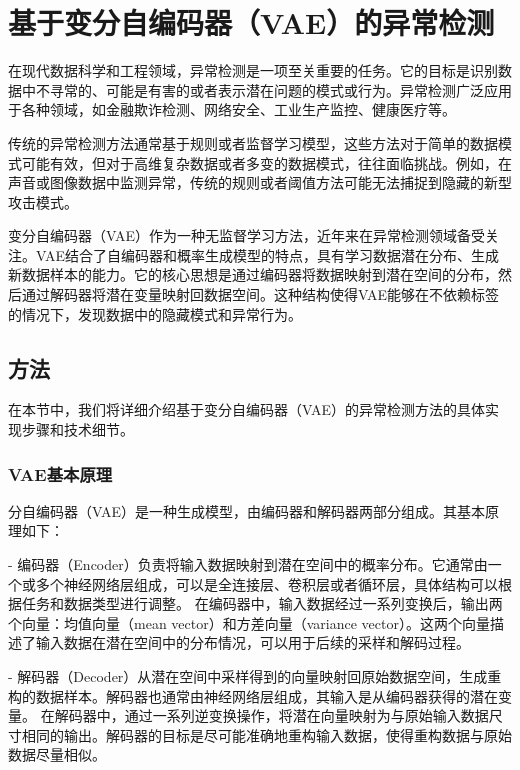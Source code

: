 
\section{基于变分自编码器（VAE）的异常检测}

在现代数据科学和工程领域，异常检测是一项至关重要的任务。它的目标是识别数据中不寻常的、可能是有害的或者表示潜在问题的模式或行为。异常检测广泛应用于各种领域，如金融欺诈检测、网络安全、工业生产监控、健康医疗等。

传统的异常检测方法通常基于规则或者监督学习模型，这些方法对于简单的数据模式可能有效，但对于高维复杂数据或者多变的数据模式，往往面临挑战。例如，在声音或图像数据中监测异常，传统的规则或者阈值方法可能无法捕捉到隐藏的新型攻击模式。

变分自编码器（VAE）\cite{VAE}作为一种无监督学习方法，近年来在异常检测领域备受关注。VAE结合了自编码器和概率生成模型的特点，具有学习数据潜在分布、生成新数据样本的能力。它的核心思想是通过编码器将数据映射到潜在空间的分布，然后通过解码器将潜在变量映射回数据空间。这种结构使得VAE能够在不依赖标签的情况下，发现数据中的隐藏模式和异常行为\cite{VAEAD}。

\subsection{方法}

在本节中，我们将详细介绍基于变分自编码器（VAE）的异常检测方法的具体实现步骤和技术细节。


\subsubsection{VAE基本原理}

分自编码器（VAE）是一种生成模型，由编码器和解码器两部分组成。其基本原理如下：

- 编码器（Encoder）负责将输入数据映射到潜在空间中的概率分布。它通常由一个或多个神经网络层组成，可以是全连接层、卷积层或者循环层，具体结构可以根据任务和数据类型进行调整。
在编码器中，输入数据经过一系列变换后，输出两个向量：均值向量（mean vector）和方差向量（variance vector）。这两个向量描述了输入数据在潜在空间中的分布情况，可以用于后续的采样和解码过程。

- 解码器（Decoder）从潜在空间中采样得到的向量映射回原始数据空间，生成重构的数据样本。解码器也通常由神经网络层组成，其输入是从编码器获得的潜在变量。
在解码器中，通过一系列逆变换操作，将潜在向量映射为与原始输入数据尺寸相同的输出。解码器的目标是尽可能准确地重构输入数据，使得重构数据与原始数据尽量相似。




